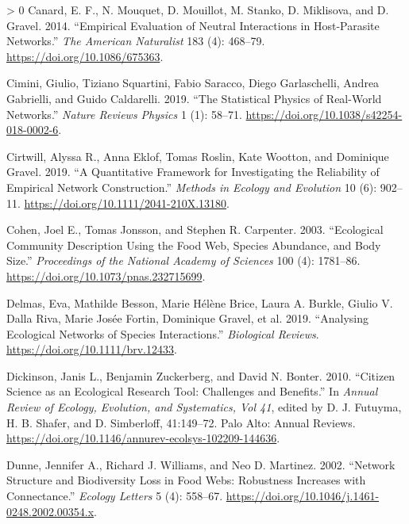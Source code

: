 \documentclass[11pt]{article}
\newlength{\cslhangindent}
\newenvironment{CSLReferences}[3] %
 {%
  \setlength{\parindent}{0pt}
  \ifodd #1 \everypar{\setlength{\hangindent}{\cslhangindent}}\ignorespaces\fi
  \ifnum #2 > 0
  \setlength{\parskip}{#2\baselineskip}
  \fi
 }%
 {}
\begin{document}
\begin{CSLReferences}{1}{0}
\leavevmode\hypertarget{ref-Canard2014EmpEva}{}%
Canard, E. F., N. Mouquet, D. Mouillot, M. Stanko, D. Miklisova, and D.
Gravel. 2014. {``Empirical Evaluation of Neutral Interactions in
Host-Parasite Networks.''} \emph{The American Naturalist} 183 (4):
468--79. \url{https://doi.org/10.1086/675363}.

\leavevmode\hypertarget{ref-Cimini2019StaPhy}{}%
Cimini, Giulio, Tiziano Squartini, Fabio Saracco, Diego Garlaschelli,
Andrea Gabrielli, and Guido Caldarelli. 2019. {``The Statistical Physics
of Real-World Networks.''} \emph{Nature Reviews Physics} 1 (1): 58--71.
\url{https://doi.org/10.1038/s42254-018-0002-6}.

\leavevmode\hypertarget{ref-Cirtwill2019QuaFrac}{}%
Cirtwill, Alyssa R., Anna Eklof, Tomas Roslin, Kate Wootton, and
Dominique Gravel. 2019. {``A Quantitative Framework for Investigating
the Reliability of Empirical Network Construction.''} \emph{Methods in
Ecology and Evolution} 10 (6): 902--11.
\url{https://doi.org/10.1111/2041-210X.13180}.

\leavevmode\hypertarget{ref-Cohen2003EcoComa}{}%
Cohen, Joel E., Tomas Jonsson, and Stephen R. Carpenter. 2003.
{``Ecological Community Description Using the Food Web, Species
Abundance, and Body Size.''} \emph{Proceedings of the National Academy
of Sciences} 100 (4): 1781--86.
\url{https://doi.org/10.1073/pnas.232715699}.

\leavevmode\hypertarget{ref-Delmas2019AnaEco}{}%
Delmas, Eva, Mathilde Besson, Marie Hélène Brice, Laura A. Burkle,
Giulio V. Dalla Riva, Marie Josée Fortin, Dominique Gravel, et al. 2019.
{``Analysing Ecological Networks of Species Interactions.''}
\emph{Biological Reviews}. \url{https://doi.org/10.1111/brv.12433}.

\leavevmode\hypertarget{ref-Dickinson2010CitSci}{}%
Dickinson, Janis L., Benjamin Zuckerberg, and David N. Bonter. 2010.
{``Citizen Science as an Ecological Research Tool: Challenges and
Benefits.''} In \emph{Annual Review of Ecology, Evolution, and
Systematics, Vol 41}, edited by D. J. Futuyma, H. B. Shafer, and D.
Simberloff, 41:149--72. Palo Alto: Annual Reviews.
\url{https://doi.org/10.1146/annurev-ecolsys-102209-144636}.

\leavevmode\hypertarget{ref-Dunne2002NetStrb}{}%
Dunne, Jennifer A., Richard J. Williams, and Neo D. Martinez. 2002.
{``Network Structure and Biodiversity Loss in Food Webs: Robustness
Increases with Connectance.''} \emph{Ecology Letters} 5 (4): 558--67.
\url{https://doi.org/10.1046/j.1461-0248.2002.00354.x}.


\end{CSLReferences}
\end{document}
